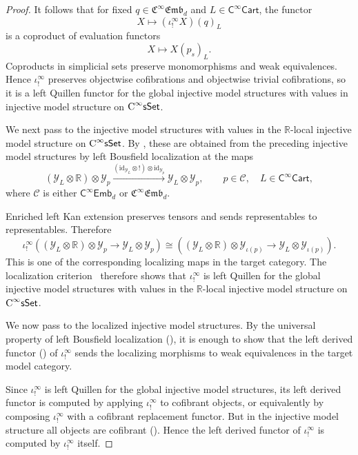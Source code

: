 \documentclass{amsart}
\newcommand{\cat}[1]{\mathsf{#1}}
\newcommand{\sset}{\cat{sSet}}
\newcommand{\id}{\mathrm{id}}
\newcommand{\CsSet}{\textnormal{C}^{\infty}\sset}
\newcommand{\Cart}{\cat{C}^{\infty}\cat{Cart}}
\newcommand{\fembnoniso}[1]{\cat{C}^{\infty}\cat{Emb}_{#1}}
\newcommand{\femb}[1]{\mathfrak{C}^{\infty}\mathfrak{Emb}_{#1}}
\newcommand{\RR}{{\mathbb{R}}}
\newcommand{\Yo}{\mathscr{Y}}
\theoremstyle{definition}
\numberwithin{equation}{subsection}
\numberwithin{subsubsection}{subsection}
\begin{document}
\begin{proof}
  It follows that for fixed \(q\in \femb{d}\) and \(L\in \Cart\), the functor
  \[
    X\longmapsto (\iota_{!}^{\infty}X)(q)_L
  \]
  is a coproduct of evaluation functors
  \[
    X\longmapsto X(p_s)_L.
  \]
  Coproducts in simplicial sets preserve monomorphisms and weak equivalences.
  Hence \(\iota_{!}^{\infty}\) preserves objectwise cofibrations and objectwise
  trivial cofibrations, so it is a left Quillen functor for the global
  injective model structures with values in injective model structure on
  \(\CsSet\).

  We next pass to the injective model structures with values in the
  \(\RR\)-local injective
  model structure on \(\CsSet\). By
  , these are obtained from the
  preceding injective model structures by left Bousfield localization at the
  maps
  \[
    (\Yo_L\otimes\RR)\otimes\Yo_p
    \xrightarrow{(\id_{\Yo_L}\otimes{!})\otimes\id_{\Yo_p}}
    \Yo_L\otimes\Yo_p,
    \qquad
    p\in\mathcal{C},\quad L\in\Cart,
  \]
  where \(\mathcal{C}\) is either \(\fembnoniso{d}\) or
  \(\femb{d}\).

  Enriched left Kan extension preserves tensors and sends representables to
  representables. Therefore
  \[
    \iota_{!}^{\infty}
    \left(
      (\Yo_L\otimes\RR)\otimes\Yo_p
      \longrightarrow
      \Yo_L\otimes\Yo_p
    \right)
    \cong
    \left((\Yo_L\otimes\RR)\otimes\Yo_{\iota(p)}
      \longrightarrow
    \Yo_L\otimes\Yo_{\iota(p)}\right) .
  \]
  This is one of the corresponding localizing maps in the target category.
  The localization criterion~\cite[Proposition~3.3.18(1)]{Hir03} therefore shows
  that
  \(\iota_{!}^{\infty}\) is left Quillen for the global injective model
  structures with values in the \(\RR\)-local injective model structure on
  \(\CsSet\).

  We now pass to the localized injective model structures. By the universal
  property of left Bousfield localization
  (), it is enough to show that
  the left
  derived functor () of \(\iota_{!}^{\infty}\) sends
  the localizing morphisms to
  weak equivalences in the target model category.

  Since \(\iota_{!}^{\infty}\) is left Quillen for the global injective model
  structures, its left derived functor is computed by applying
  \(\iota_{!}^{\infty}\) to cofibrant objects, or equivalently by composing
  \(\iota_{!}^{\infty}\) with a cofibrant replacement functor. But in the
  injective model structure all objects are cofibrant
  (). Hence the left derived
  functor of \(\iota_{!}^{\infty}\) is computed by \(\iota_{!}^{\infty}\)
  itself.


\end{proof}
\end{document}
